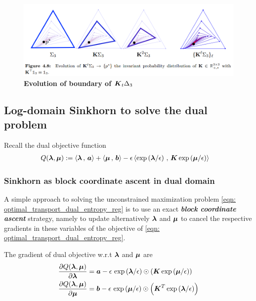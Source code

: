 \documentclass[11pt]{article}
\begin{document}
\begin{figure}
\begin{minipage}[t]{1\linewidth}
  \centering
  \centerline{\includegraphics[scale = 0.42]{sinkhorn_boundary.png}}
\end{minipage}
\caption{\footnotesize{\textbf{Evolution of boundary of $\boldsymbol{K}_t \Delta_{3}$}}}
\label{fig: sinkhorn_boundary}
\end{figure}


\subsection{Log-domain Sinkhorn to solve the dual problem}
Recall the dual objective function
\begin{align}
Q(\boldsymbol{\lambda}, \boldsymbol{\mu}) &:= \left\langle \boldsymbol{\lambda}\,,\, \boldsymbol{a} \right\rangle + \left\langle \boldsymbol{\mu}\,,\, \boldsymbol{b} \right\rangle - \epsilon \left\langle \exp\left(\boldsymbol{\lambda}/\epsilon\right)\,,\, \boldsymbol{K}\exp\left(\boldsymbol{\mu}/\epsilon\right) \right\rangle  \label{eqn: optimal_transport_dual_entropy_reg_obj}
\end{align}

\subsubsection{Sinkhorn as block coordinate ascent in dual domain}
A simple approach to solving the unconstrained maximization problem \eqref{eqn: optimal_transport_dual_entropy_reg} is to use an exact \emph{\textbf{block coordinate ascent}} strategy, namely to update alternatively $\boldsymbol{\lambda}$ and $\boldsymbol{\mu}$ to cancel the respective gradients in these variables of the objective of \eqref{eqn: optimal_transport_dual_entropy_reg}. 

The gradient of dual objective w.r.t $\boldsymbol{\lambda}$ and $\boldsymbol{\mu}$ are
\begin{align}
\frac{\partial Q(\boldsymbol{\lambda}, \boldsymbol{\mu})}{ \partial \boldsymbol{\lambda}} &= \boldsymbol{a} - \epsilon\, \exp\left(\boldsymbol{\lambda}/\epsilon\right)\odot \left(\boldsymbol{K}\exp\left(\boldsymbol{\mu}/\epsilon\right)\right)   \label{eqn: ent_reg_dual_obj_grad_lambda} \\
\frac{\partial Q(\boldsymbol{\lambda}, \boldsymbol{\mu})}{ \partial \boldsymbol{\mu}} &= \boldsymbol{b} - \epsilon\, \exp\left(\boldsymbol{\mu}/\epsilon\right)\odot \left(\boldsymbol{K}^{T}\exp\left(\boldsymbol{\lambda}/\epsilon\right)\right)   \label{eqn: ent_reg_dual_obj_grad_mu}
\end{align} 
\end{document}

